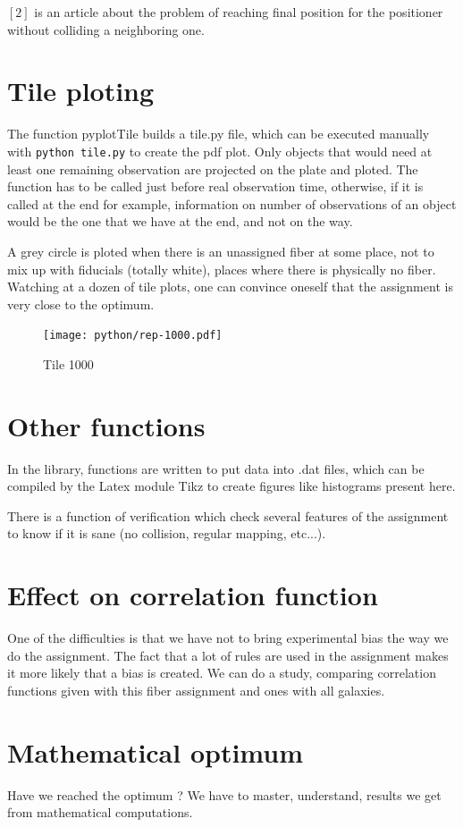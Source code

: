 \documentclass{article}
\begin{document}
$[2]$ is an article about the problem of reaching final position for the positioner without colliding a neighboring one.

\section{Tile ploting}
The function pyplotTile builds a tile.py file, which can be executed manually with {\tt python tile.py} to create the pdf plot.
Only objects that would need at least one remaining observation are projected on the plate and ploted. The function has to be called just before real observation time, otherwise, if it is called at the end for example, information on number of observations of an object would be the one that we have at the end, and not on the way.

A grey circle is ploted when there is an unassigned fiber at some place, not to mix up with fiducials (totally white), places where there is physically no fiber.
Watching at a dozen of tile plots, one can convince oneself that the assignment is very close to the optimum.

\begin{figure}[H]
\hspace*{-1.5cm}
    \texttt{[image: python/rep-1000.pdf]}
	\caption{Tile 1000}
\end{figure}

\section{Other functions}
In the library, functions are written to put data into .dat files, which can be compiled by the Latex module Tikz to create figures like histograms present here.

There is a function of verification which check several features of the assignment to know if it is sane (no collision, regular mapping, etc...).

\section{Effect on correlation function}
One of the difficulties is that we have not to bring experimental bias the way we do the assignment. The fact that a lot of rules are used in the assignment makes it more likely that a bias is created.
We can do a study, comparing correlation functions given with this fiber assignment and ones with all galaxies.


\section{Mathematical optimum}
Have we reached the optimum ? We have to master, understand, results we get from mathematical computations.
\end{document}
